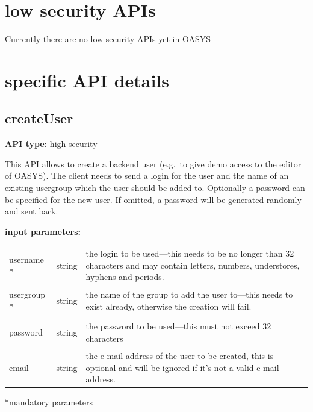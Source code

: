 \documentclass[12pt]{article} %
\newenvironment{keyword}{\leavevmode\color{magenta}}{}
\newenvironment{parameters}
{
    \footnotesize\renewcommand{\arraystretch}{1.30}
    \renewcommand{\tabcolsep}{0pt}
    \begin{longtable}{>{\begin{keyword}}p{3cm}<{\end{keyword}}>{\begin{em}}p{1.5cm}<{\end{em}}p{12.5cm}}
        \hline
        }
        {
        \hline
    \end{longtable}\scriptsize\vspace{-5mm}*mandatory parameters\vspace{5mm}
}
\begin{document}
    \section{low security APIs}\label{sec:low-security-apis}
    Currently there are no low security APIs yet in OASYS


    \section{specific API details}\label{sec:specific-api-details}

    \subsection{createUser}\label{subsec:createuser}

    \textbf{API type:} high security

    This API allows to create a backend user (e.g.\ to give demo access to the editor of OASYS).
    The client needs to send a login for the user and the name of an existing usergroup which the user should be added to.
    Optionally a password can be specified for the new user.
    If omitted, a password will be generated randomly and sent back.\\

    \begin{minipage}{\textwidth}
        \textbf{input parameters:}
        \begin{parameters}
            username *  & string & the login to be used—this needs to be no longer than 32 characters and may contain letters, numbers, understores, hyphens and periods. \\
            usergroup * & string & the name of the group to add the user to—this needs to exist already, otherwise the creation will fail.                                \\
            password    & string & the password to be used—this must not exceed 32 characters                                                                             \\
            email       & string & the e-mail address of the user to be created, this is optional and will be ignored if it's not a valid e-mail address. \\
        \end{parameters}
    \end{minipage}
\end{document}
